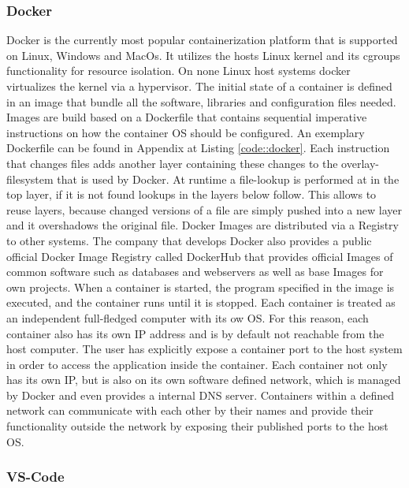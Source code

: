 \documentclass[12pt, a4paper]{article}
\begin{document}
        \subsubsection{Docker}
        Docker is the currently most popular containerization platform \cite{docker_share} that is supported on Linux, Windows and MacOs. It utilizes the hosts Linux kernel and its cgroups functionality for resource isolation. On none Linux host systems docker virtualizes the kernel via a hypervisor. \newline
        The initial state of a container is defined in an image that bundle all the software, libraries and configuration files needed. Images are build based on a Dockerfile that contains sequential imperative instructions on how the container \ac{OS} should be configured. An exemplary Dockerfile can be found in Appendix at Listing \ref{code::docker}. Each instruction that changes files adds another layer containing these changes to the overlay-filesystem that is used by Docker. At runtime a file-lookup is performed at in the top layer, if it is not found lookups in the layers below follow. This allows to reuse layers, because changed versions of a file are simply pushed into a new layer and it overshadows the original file. Docker Images are distributed via a Registry to other systems. The company that develops Docker also provides a public official Docker Image Registry called DockerHub that provides official Images of common software such as databases and webservers as well as base Images for own projects.\newline
        When a container is started, the program specified in the image is executed, and the container runs until it is stopped. Each container is treated as an independent full-fledged computer with its ow \ac{OS}. For this reason, each container also has its own \acs{IP} address and is by default not reachable from the host computer. The user has explicitly expose a container port to the host system in order to access the application inside the container. Each container not only has its own \acs{IP}, but is also on its own software defined network, which is managed by Docker and even provides a internal DNS server. Containers within a defined network can communicate with each other by their names and provide their functionality outside the network by exposing their published ports to the host \ac{OS}.
    \subsubsection{VS-Code}
\end{document}
